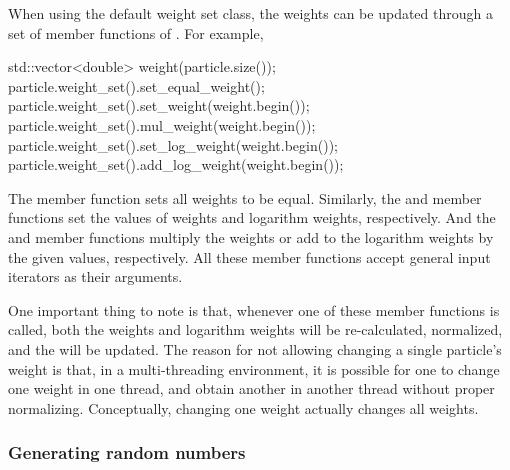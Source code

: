 When using the default weight set class, the weights can be updated through a
set of member functions of . For example,
\begin{cppcode}
std::vector<double> weight(particle.size());
particle.weight_set().set_equal_weight();
particle.weight_set().set_weight(weight.begin());
particle.weight_set().mul_weight(weight.begin());
particle.weight_set().set_log_weight(weight.begin());
particle.weight_set().add_log_weight(weight.begin());
\end{cppcode}
The  member function sets all weights to be equal.
Similarly, the  and  member
functions set the values of weights and logarithm weights, respectively. And
the  and  member functions
multiply the weights or add to the logarithm weights by the given values,
respectively. All these member functions accept general input iterators as
their arguments.

One important thing to note is that, whenever one of these member functions is
called, both the weights and logarithm weights will be re-calculated,
normalized, and the \ess will be updated. The reason for not allowing changing
a single particle's weight is that, in a multi-threading environment, it is
possible for one to change one weight in one thread, and obtain another in
another thread without proper normalizing. Conceptually, changing one weight
actually changes all weights.

\subsubsection{Generating random numbers}
\label{ssub:Generating random numbers}

